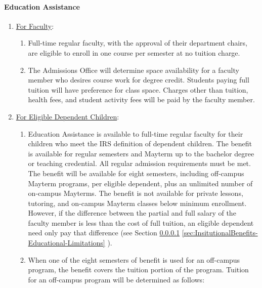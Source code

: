 			\paragraph{Education Assistance}
				\label{sec:InsitutionalBenefits-Educational}
				\begin{enumerate}[label=\alph*)]
					\item{\underline{For Faculty}:
						\begin{enumerate}[label=\arabic*)]

							\item{Full-time regular faculty, with the approval
								of their department chairs, are eligible to enroll
								in one course per semester at no tuition charge.}

							\item{The Admissions Office will determine space
								availability for a faculty member who desires course
								work for degree credit.  Students paying full
								tuition will have preference for class space.
								Charges other than tuition, health fees, and student
								activity fees will be paid by the faculty member.}

						\end{enumerate}
					}
					\item{\underline{For Eligible Dependent Children}:
						\begin{enumerate}[label=\arabic*)]

							\item{Education Assistance is available to full-time
								regular faculty for their children who meet the IRS
								definition of dependent children.  The benefit is
								available for regular semesters and Mayterm up to
								the bachelor degree or teaching credential. All
								regular admission requirements must be met.  The
								benefit will be available for eight semesters,
								including off-campus Mayterm programs, per eligible
								dependent, plus an unlimited number of on-campus
								Mayterms.  The benefit is not available for private
								lessons, tutoring, and on-campus Mayterm classes
								below minimum enrollment.  However, if the
								difference between the partial and full salary of
								the faculty member is less than the cost of full
								tuition, an eligible dependent need only pay that
								difference (see Section
								\ref{sec:InsitutionalBenefits-Educational}
								\ref{sec:InsitutionalBenefits-Educational-Limitations}
								).}

							\item{When one of the eight semesters of benefit is
								used for an off-campus program, the benefit covers
								the tuition portion of the program.  Tuition for an
								off-campus program will be determined as follows:

}
\end{enumerate}}
\end{enumerate}
